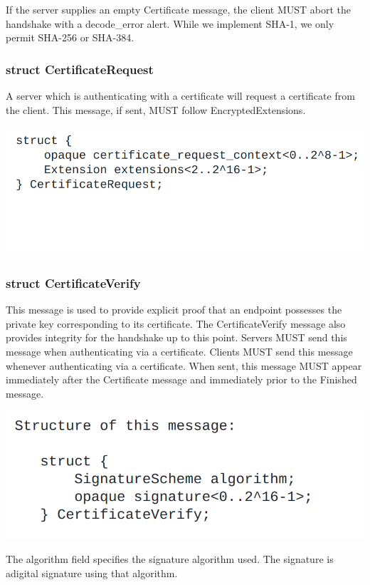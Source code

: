 \documentclass{article}
\begin{document}
If the server supplies an empty Certificate message, the client MUST abort the handshake with a decode\_error alert.
While we implement SHA-1, we only permit SHA-256 or SHA-384.

\subsubsection{struct CertificateRequest}
A server which is authenticating with a certificate will request a certificate from the client.
This message, if sent, MUST follow EncryptedExtensions.

\begin{center}
    \includegraphics[width=0.75\columnwidth]{media/CertRequest.png}
\end{center}


\subsubsection{struct CertificateVerify}
This message is used to provide explicit proof that an endpoint possesses the private key corresponding to its certificate.
The CertificateVerify message also provides integrity for the handshake up to this point.
Servers MUST send this message when authenticating via a certificate.
Clients MUST send this message whenever authenticating via a certificate.
When sent, this message MUST appear immediately after the Certificate message and immediately prior to the Finished message.
\begin{center}
    \includegraphics[width=0.6\columnwidth]{media/CertVerify.png}
\end{center}
The algorithm field specifies the signature algorithm used.
The signature is adigital signature using that algorithm.
\end{document}
